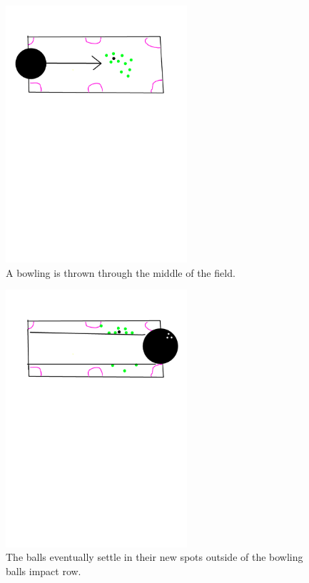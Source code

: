 \documentclass{article}
\begin{document}
\begin{figure}[!htb]
	\centering
	\includegraphics[trim={2cm 17cm 2cm 2cm},width=0.6\textwidth,clip]{img/game_state_4.png}
	\caption{A bowling is thrown through the middle of the field.}
	\label{fig:game_state_4}
\end{figure}

\begin{figure}[!htb]
	\centering
	\includegraphics[trim={2cm 17cm 0cm 2cm},width=0.6\textwidth,clip]{img/game_state_5.png}
	\caption{The balls eventually settle in their new spots outside of the bowling balls impact row.}
	\label{fig:game_state_5}
\end{figure}
\end{document}
